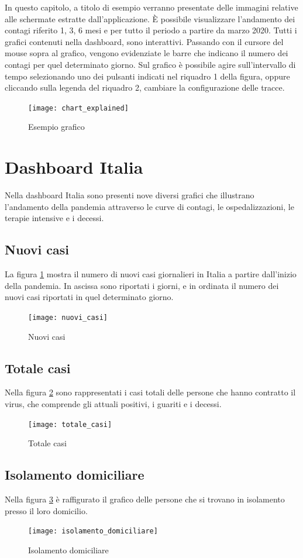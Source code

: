 In questo capitolo, a titolo di esempio verranno presentate delle immagini relative alle schermate estratte dall'applicazione.
È possibile visualizzare l’andamento dei contagi riferito 1, 3, 6 mesi e per tutto il periodo a partire da marzo 2020.
Tutti i grafici contenuti nella dashboard, sono interattivi.
Passando con il cursore del mouse sopra al grafico, vengono evidenziate le barre che indicano il numero dei contagi per quel determinato giorno.
Sul grafico è possibile agire sull'intervallo di tempo selezionando uno dei pulsanti indicati nel riquadro 1 della figura, oppure cliccando sulla legenda del riquadro 2, cambiare la configurazione delle tracce.
\begin{figure}[htp]
    \centering
    \texttt{[image: chart\_explained]}
    \caption{Esempio grafico}
\end{figure}
\section{Dashboard Italia}
Nella dashboard Italia sono presenti nove diversi grafici che illustrano l’andamento della pandemia attraverso le curve di contagi, le ospedalizzazioni, le terapie intensive e i decessi.
\subsection{Nuovi casi}
La figura \ref{fig:nuovi_casi} mostra il numero di nuovi casi giornalieri in Italia a partire dall'inizio della pandemia.
In ascissa sono riportati i giorni, e in ordinata il numero dei nuovi casi riportati in quel determinato giorno.
\begin{figure}[htp]
    \centering
    \texttt{[image: nuovi\_casi]}
    \caption{Nuovi casi}
    \label{fig:nuovi_casi}
\end{figure}

\subsection{Totale casi}
Nella figura \ref{fig:totale_casi} sono rappresentati i casi totali delle persone che hanno contratto il virus, che comprende gli attuali positivi, i guariti e i decessi.
\begin{figure}[htp]
    \centering
    \texttt{[image: totale\_casi]}
    \caption{Totale casi}
    \label{fig:totale_casi}
\end{figure}

\subsection{Isolamento domiciliare}
Nella figura \ref{fig:isolamento_domiciliare} è raffigurato il grafico delle persone che si trovano in isolamento presso il loro domicilio.
\begin{figure}[htp]
    \centering
    \texttt{[image: isolamento\_domiciliare]}
    \caption{Isolamento domiciliare}
    \label{fig:isolamento_domiciliare}
\end{figure}


